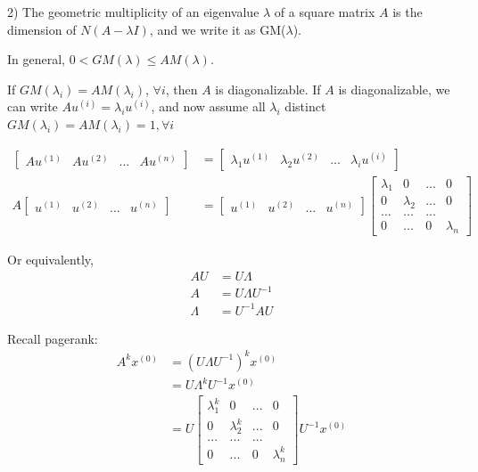 2) The geometric multiplicity of an eigenvalue $\lambda$ of a square matrix $A$ is the dimension of $N(A - \lambda I)$, and we write it as GM($\lambda$).

In general, $0 < GM(\lambda) \leq AM(\lambda)$. 

\vspace{0.3cm}
If $GM(\lambda_i) = AM(\lambda_i)$, $\forall i$, then $A$ is diagonalizable. If $A$ is diagonalizable, we can write $Au^{(i)} = \lambda_iu^{(i)}$, and now assume all $\lambda_i$ distinct $GM(\lambda_i) = AM(\lambda_i) = 1, \forall i$

\begin{align*}
\left[
\begin{matrix}
Au^{(1)} & Au^{(2)} &... &Au^{(n)} 
\end{matrix}
\right] 
&=
\left[
\begin{matrix}
\lambda_1u^{(1)} & \lambda_2u^{(2)}&... &\lambda_iu^{(i)}
\end{matrix}
\right]\\
A
\left[
\begin{matrix}
u^{(1)} & u^{(2)} &... &u^{(n)} 
\end{matrix}
\right] &=
\left[
\begin{matrix}
u^{(1)} & u^{(2)} &... &u^{(n)}
\end{matrix}
\right]
\left[
\begin{matrix}
\lambda_1 & 0 & ... & 0\\
0& \lambda_2  &  ... & 0\\
...  & ...  &   ...& \\
0    &  ... &  0 & \lambda_n
\end{matrix}
\right]
\end{align*}

Or equivalently,
\begin{align*}
AU &= U\Lambda\\
A &= U\Lambda U^{-1}\\
\Lambda &= U^{-1}AU
\end{align*}

Recall pagerank:
\begin{align*}
A^kx^{(0)} &= (U\Lambda U^{-1})^kx^{(0)}\\
&=U\Lambda^kU^{-1}x^{(0)} \\
&= U
\begin{bmatrix}
\lambda_1^k & 0 & ... & 0\\
0& \lambda_2^k  &  ... & 0\\
...  & ...  &   ...& \\
0    &  ... &  0 & \lambda_n^k
\end{bmatrix} U^{-1}x^{(0)}
\end{align*}

